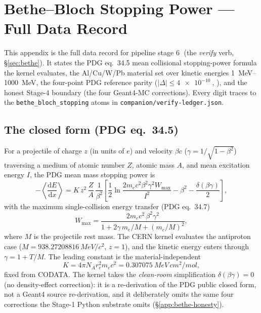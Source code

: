 \section{Bethe--Bloch Stopping Power --- Full Data Record}
\label{app:bethe}

This appendix is the full data record for pipeline stage
\textcircled{\scriptsize 6} (the \emph{verify} verb,
\S\ref{sec:bethe}). It states the PDG eq.~34.5 mean collisional
stopping-power formula the kernel evaluates, the Al/Cu/W/Pb material set
over kinetic energies \SIrange{1}{1000}{MeV}, the four-point PDG
reference parity ($|\Delta|\!\le\!\SI{4e-10}{}$, \tierGreen), and the
honest Stage-4 boundary (the four Geant4-MC corrections). Every digit
traces to the \verb|bethe_bloch_stopping| atoms in
\texttt{companion/verify-ledger.json}.

\subsection{The closed form (PDG eq.~34.5)}
\label{app:bethe-eq}

For a projectile of charge $z$ (in units of $e$) and velocity $\beta c$
($\gamma=1/\sqrt{1-\beta^2}$) traversing a medium of atomic number $Z$,
atomic mass $A$, and mean excitation energy $I$, the PDG mean mass
stopping power is \citep{pdg2024}
\begin{equation}
-\left\langle\frac{\mathrm{d}E}{\mathrm{d}x}\right\rangle
  = K\,z^{2}\,\frac{Z}{A}\,\frac{1}{\beta^{2}}
   \left[\frac12\ln\!\frac{2 m_e c^{2}\beta^{2}\gamma^{2} W_{\max}}{I^{2}}
   - \beta^{2} - \frac{\delta(\beta\gamma)}{2}\right],
\label{eq:app-bethe}
\end{equation}
with the maximum single-collision energy transfer (PDG eq.~34.7)
\begin{equation}
W_{\max}
  = \frac{2 m_e c^{2}\,\beta^{2}\gamma^{2}}
         {1 + 2\gamma\,m_e/M + (m_e/M)^{2}},
\label{eq:app-tmax}
\end{equation}
where $M$ is the projectile rest mass. The CERN kernel evaluates the
antiproton case ($M=\SI{938.27208816}{MeV/c^2}$, $z=1$), and the kinetic
energy enters through $\gamma = 1 + T/M$. The leading constant is the
material-independent
\begin{equation}
K = 4\pi N_A r_e^{2} m_e c^{2}
  = \SI{0.307075}{MeV\,cm^2/mol},
\label{eq:app-K}
\end{equation}
fixed from CODATA. The kernel takes the \emph{clean-room} simplification
$\delta(\beta\gamma)=0$ (no density-effect correction): it is a
re-derivation of the PDG public closed form, not a Geant4 source
re-derivation, and it deliberately omits the same four corrections the
Stage-1 Python substrate omits (\S\ref{app:bethe-honesty}).

